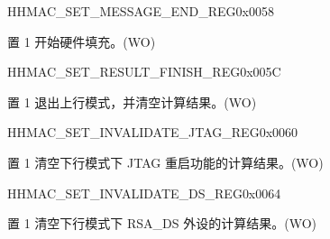 \begin{register}{H}{HMAC\_SET\_MESSAGE\_END\_REG}{0x0058}\label{regdesc:HMACSETMESSAGEENDREG}
%
%
\regnewline%
\begin{regdesc}\begin{reglist}
\label{fielddesc:HMACSETTEXTEND}\item [HMAC\_SET\_TEXT\_END] 置 1 开始硬件填充。(WO)
\end{reglist}\end{regdesc}
\end{register}


\begin{register}{H}{HMAC\_SET\_RESULT\_FINISH\_REG}{0x005C}\label{regdesc:HMACSETRESULTFINISHREG}
%
%
\regnewline%
\begin{regdesc}\begin{reglist}
\label{fielddesc:HMACSETRESULTEND}\item [HMAC\_SET\_RESULT\_END] 置 1 退出上行模式，并清空计算结果。(WO)
\end{reglist}\end{regdesc}
\end{register}


\begin{register}{H}{HMAC\_SET\_INVALIDATE\_JTAG\_REG}{0x0060}\label{regdesc:HMACSETINVALIDATEJTAGREG}
%
%
\regnewline%
\begin{regdesc}\begin{reglist}
\label{fielddesc:HMACSETINVALIDATEJTAG}\item [HMAC\_SET\_INVALIDATE\_JTAG] 置 1 清空下行模式下 JTAG 重启功能的计算结果。(WO)
\end{reglist}\end{regdesc}
\end{register}


\begin{register}{H}{HMAC\_SET\_INVALIDATE\_DS\_REG}{0x0064}\label{regdesc:HMACSETINVALIDATEDSREG}
%
%
\regnewline%
\begin{regdesc}\begin{reglist}
\label{fielddesc:HMACSETINVALIDATEDS}\item [HMAC\_SET\_INVALIDATE\_DS] 置 1 清空下行模式下 RSA\_DS 外设的计算结果。(WO)
\end{reglist}\end{regdesc}
\end{register}


